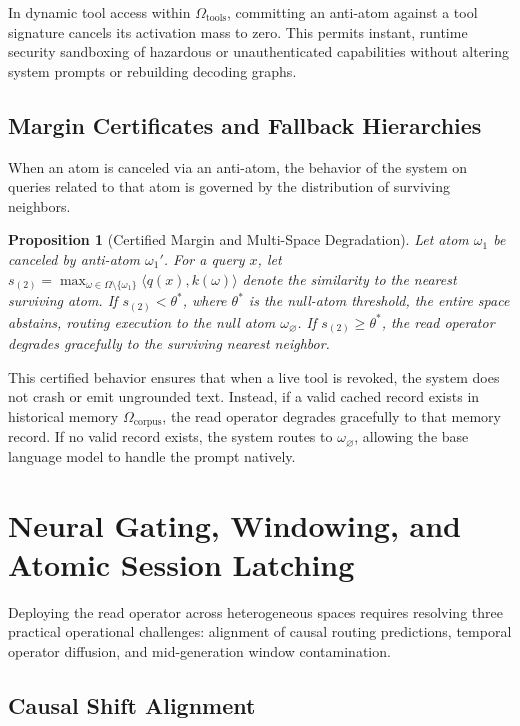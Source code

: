 \documentclass[preprint,12pt]{elsarticle}
\newtheorem{proposition}{Proposition}
\begin{document}
In dynamic tool access within $\Omega_{\mathrm{tools}}$, committing an anti-atom against a tool signature cancels its activation mass to zero. This permits instant, runtime security sandboxing of hazardous or unauthenticated capabilities without altering system prompts or rebuilding decoding graphs.

\subsection{Margin Certificates and Fallback Hierarchies}

When an atom is canceled via an anti-atom, the behavior of the system on queries related to that atom is governed by the distribution of surviving neighbors.

\begin{proposition}[Certified Margin and Multi-Space Degradation]
Let atom $\omega_1$ be canceled by anti-atom $\omega_1'$. For a query $x$, let $s_{(2)} = \max_{\omega \in \Omega \setminus \{\omega_1\}} \langle q(x), k(\omega) \rangle$ denote the similarity to the nearest surviving atom. If $s_{(2)} < \theta^*$, where $\theta^*$ is the null-atom threshold, the entire space abstains, routing execution to the null atom $\omega_\varnothing$. If $s_{(2)} \ge \theta^*$, the read operator degrades gracefully to the surviving nearest neighbor.
\label{prop:margin}
\end{proposition}

This certified behavior ensures that when a live tool is revoked, the system does not crash or emit ungrounded text. Instead, if a valid cached record exists in historical memory $\Omega_{\mathrm{corpus}}$, the read operator degrades gracefully to that memory record. If no valid record exists, the system routes to $\omega_\varnothing$, allowing the base language model to handle the prompt natively.

\section{Neural Gating, Windowing, and Atomic Session Latching}

Deploying the read operator across heterogeneous spaces requires resolving three practical operational challenges: alignment of causal routing predictions, temporal operator diffusion, and mid-generation window contamination.

\subsection{Causal Shift Alignment}
\end{document}
